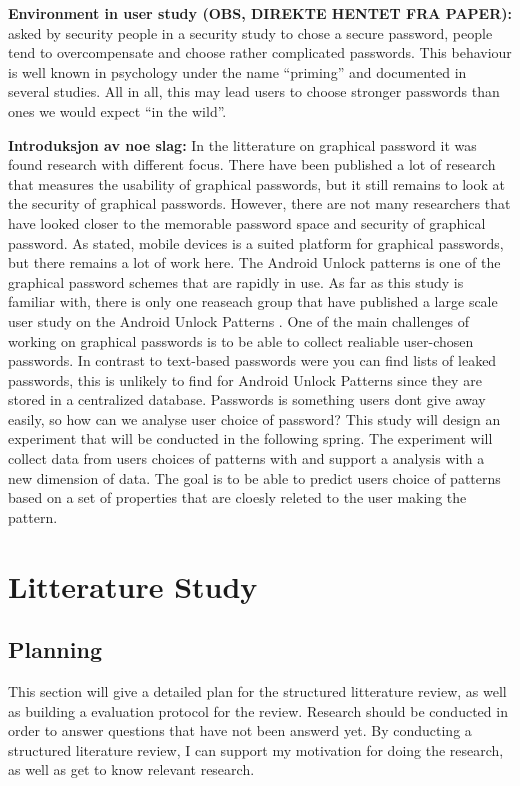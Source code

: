   {\bf Environment in user study (OBS, DIREKTE HENTET FRA PAPER):} asked by security people in a security study to chose a secure password, people tend to overcompensate and choose rather complicated passwords. This behaviour is well known in psychology under the name ``priming'' and documented in several studies. All in all, this may lead users to choose stronger passwords than ones we would expect ``in the wild''.

  {\bf Introduksjon av noe slag:} In the litterature on graphical password it was found research with different focus. There have been published a lot of research that measures the usability of graphical passwords, but it still remains to look at the security of graphical passwords. However, there are not many researchers that have looked closer to the memorable password space and security of graphical password. As stated, mobile devices is a suited platform for graphical passwords, but there remains a lot of work here. The Android Unlock patterns is one of the graphical password schemes that are rapidly in use. As far as this study is familiar with, there is only one reaseach group that have published a large scale user study on the Android Unlock Patterns \cite{Ullenbeck}. One of the main challenges of working on graphical passwords is to be able to collect realiable user-chosen passwords. In contrast to text-based passwords were you can find lists of leaked passwords, this is unlikely to find for Android Unlock Patterns since they are stored in a centralized database. Passwords is something users dont give away easily, so how can we analyse user choice of password?  This study will design an experiment that will be conducted in the following spring. The experiment will collect data from users choices of patterns with and support a analysis with a new dimension of data. The goal is to be able to predict users choice of patterns based on a set of properties that are cloesly releted to the user making the pattern.



\chapter{Litterature Study}
  \section{Planning}
    This section will give a detailed plan for the structured litterature review, as well as building a 
    evaluation protocol for the review. 
    Research should be conducted in order to answer questions that have not been answerd yet. 
    By conducting a structured literature review, I can support my motivation for doing the research, 
    as well as get to know relevant research. 

